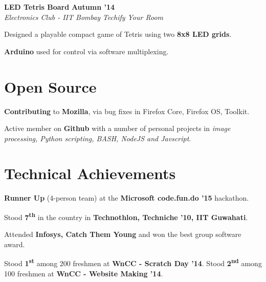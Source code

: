 \documentclass[11pt]{resume}
\begin{document}
\begin{resume}
\textbf{LED Tetris Board} \hfill \textbf{Autumn '14}\\
\textsl{Electronics Club - IIT Bombay} \hfill \textsl{Techify Your Room}\\
\vspace{-4mm}
\begin{list2}
\item Designed a playable compact game of Tetris using two \textbf{8x8 LED grids}.
\item \textbf{Arduino} used for control via software multiplexing.
\end{list2}


\section{\mysidestyle Open Source}

\begin{list2}
\item \textbf{Contributing} to \textbf{Mozilla}, via bug fixes in Firefox Core, Firefox OS, Toolkit.
\item Active member on \textbf{Github} with a number of personal projects in \textsl{image processing, Python scripting, BASH, NodeJS and Javscript}.

\end{list2}



\section{\mysidestyle Technical Achievements} 
\begin{list2}
\item\textbf{Runner Up} (4-person team) at the \textbf{Microsoft code.fun.do '15} hackathon.

\item Stood \textbf {7\textsuperscript{th}} in the country in \textbf {Technothlon, Techniche '10, IIT Guwahati}.

\item Attended \textbf{Infosys, Catch Them Young} and won the best group software award. 

\item Stood \textbf {1\textsuperscript{st}} among 200 freshmen at \textbf {WnCC - Scratch Day '14}. Stood \textbf {2\textsuperscript{nd}} among 100 freshmen at \textbf {WnCC - Website Making '14}.



\end{list2}






\end{resume}
\end{document}
